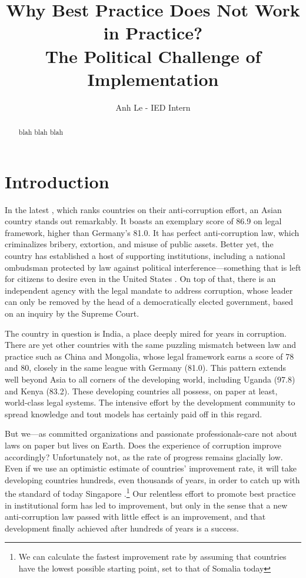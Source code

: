 \documentclass[12pt]{article}
\title{Why Best Practice Does Not Work in Practice?\\
        The Political Challenge of Implementation}
\author{Anh Le - IED Intern}
\date{}
\begin{document}
\maketitle
\begin{abstract}
blah blah blah
\end{abstract}

\section{Introduction}
\label{sec:intro}

In the latest \citet{Integrity2012a}, which ranks countries on their anti-corruption effort, an Asian country stands out remarkably. It boasts an exemplary score of 86.9 on legal framework, higher than Germany's 81.0. It has perfect anti-corruption law, which criminalizes bribery, extortion, and misuse of public assets. Better yet, the country has established a host of supporting institutions, including a national ombudsman protected by law against political interference---something that is left for citizens to desire even in the United States \citep{MinistryofLawandJustice2003}. On top of that, there is an independent agency with the legal mandate to address corruption, whose leader can only be removed by the head of a democratically elected government, based on an inquiry by the Supreme Court.

The country in question is India, a place deeply mired for years in corruption. There are yet other countries with the same puzzling mismatch between law and practice such as China and Mongolia, whose legal framework earns a score of 78 and 80, closely in the same league with Germany (81.0). This pattern extends well beyond Asia to all corners of the developing world, including Uganda (97.8) and Kenya (83.2). These developing countries all possess, on paper at least, world-class legal systems. The intensive effort by the development community to spread knowledge and tout models has certainly paid off in this regard.

But we---as committed organizations and passionate professionals-care not about laws on paper but lives on Earth. Does the experience of corruption improve accordingly? Unfortunately not, as the rate of progress remains glacially low. Even if we use an optimistic estimate of countries' improvement rate, it will take developing countries hundreds, even thousands of years, in order to catch up with the standard of today Singapore \citep{Pritchett2010}.\footnote{We can calculate the fastest improvement rate by assuming that countries have the lowest possible starting point, set to that of Somalia today} Our relentless effort to promote best practice in institutional form has led to improvement, but only in the sense that a new anti-corruption law passed with little effect is an improvement, and that development finally achieved after hundreds of years is a success.
\end{document}
